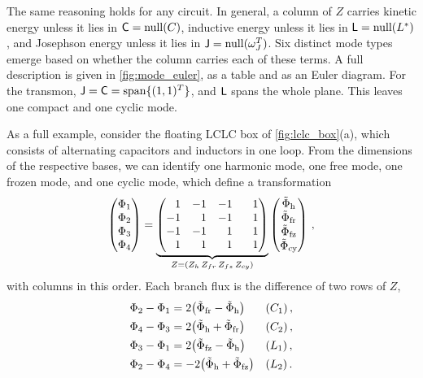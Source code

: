 The same reasoning holds for any circuit.
In general, a column of $Z$ carries kinetic energy unless it lies in $\mathsf{C}=\operatorname{null}(C)$, inductive energy unless it lies in $\mathsf{L}=\operatorname{null}(L^*)$, and Josephson energy unless it lies in $\mathsf{J}=\operatorname{null}(\omega_J^T)$.
Six distinct mode types emerge based on whether the column carries each of these terms.
A full description is given in \cref{fig:mode_euler}, as a table and as an Euler diagram.
For the transmon, $\mathsf{J}=\mathsf{C}=\operatorname{span}\{(1,1)^T\}$, and $\mathsf{L}$ spans the whole plane.
This leaves one compact and one cyclic mode.

As a full example, consider the floating LCLC box of \cref{fig:lclc_box}(a), which consists of alternating capacitors and inductors in one loop.
From the dimensions of the respective bases, we can identify one harmonic mode, one free mode, one frozen mode, and one cyclic mode, which define a transformation
\begin{equation}
    \begin{pmatrix}\Phi_1\\\Phi_2\\\Phi_3\\\Phi_4\end{pmatrix}
    = \underbrace{\begin{pmatrix}
       \phantom{-} 1 & -1 & -1 &\phantom{-} 1 \\
        -1 &\phantom{-} 1 & -1 &\phantom{-} 1 \\
        -1 & -1 &\phantom{-} 1 &\phantom{-} 1 \\
       \phantom{-} 1 &\phantom{-} 1 &\phantom{-} 1 &\phantom{-} 1
    \end{pmatrix}}_{Z= \left(Z_h \, Z_{fr} \, Z_{fz} \, Z_{cy} \right)}
    \begin{pmatrix}\tilde\Phi_{\rm h}\\\tilde\Phi_{\rm fr}\\\tilde\Phi_{\rm fz}\\\tilde\Phi_{\rm cy}\end{pmatrix} \,,
    \label{eq:lclc_Z}
\end{equation}
with columns in this order.
Each branch flux is the difference of two rows of $Z$,
\begin{align*}
    \Phi_2-\Phi_1&=2\bigl(\tilde\Phi_{\rm fr}-\tilde\Phi_{\rm h}\bigr) && (C_1)\,,\\
    \Phi_4-\Phi_3&=2\bigl(\tilde\Phi_{\rm h}+\tilde\Phi_{\rm fr}\bigr) && (C_2)\,,\\
    \Phi_3-\Phi_1&=2\bigl(\tilde\Phi_{\rm fz}-\tilde\Phi_{\rm h}\bigr) && (L_1)\,,\\
    \Phi_2-\Phi_4&=-2\bigl(\tilde\Phi_{\rm h}+\tilde\Phi_{\rm fz}\bigr) && (L_2)\,.
\end{align*}
